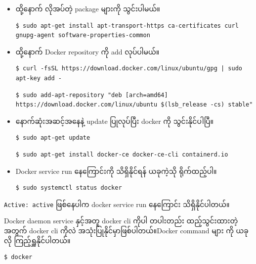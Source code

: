 \documentclass[]{article}
\begin{document}
\begin{itemize}
\item
  ထို့နောက် လိုအပ်တဲ့ package များကို သွင်းပါမယ်။

\begin{verbatim}
$ sudo apt-get install apt-transport-https ca-certificates curl gnupg-agent software-properties-common
\end{verbatim}
\item
  ထို့နောက် Docker repository ကို add လုပ်ပါမယ်။

\begin{verbatim}
$ curl -fsSL https://download.docker.com/linux/ubuntu/gpg | sudo apt-key add -
\end{verbatim}

\begin{verbatim}
$ sudo add-apt-repository "deb [arch=amd64] https://download.docker.com/linux/ubuntu $(lsb_release -cs) stable"
\end{verbatim}
\item
  နောက်ဆုံးအဆင့်အနေနဲ့ update ပြုလုပ်ပြီး docker ကို သွင်းနိုင်ပါပြီ။

\begin{verbatim}
$ sudo apt-get update
\end{verbatim}

\begin{verbatim}
$ sudo apt-get install docker-ce docker-ce-cli containerd.io
\end{verbatim}
\item
  Docker service run နေကြောင်းကို သိရှိနိုင်ရန် ယခုကဲ့သို ရိုက်ထည့်ပါ။

\begin{verbatim}
$ sudo systemctl status docker
\end{verbatim}
\end{itemize}

\texttt{Active:\ active} ဖြစ်နေပါက docker service run နေကြောင်း
သိရှိနိုင်ပါတယ်။

Docker daemon service နှင့်အတူ docker cli ကိုပါ တပါးတည်း ထည့်သွင်းထားတဲ့
အတွက် docker cli ကိုလဲ အသုံးပြုနိုင်မှာဖြစ်ပါတယ်။Docker command များ ကို
ယခုလို ကြည့်ရှူနိုင်ပါတယ်။

\begin{verbatim}
$ docker
\end{verbatim}
\end{document}
